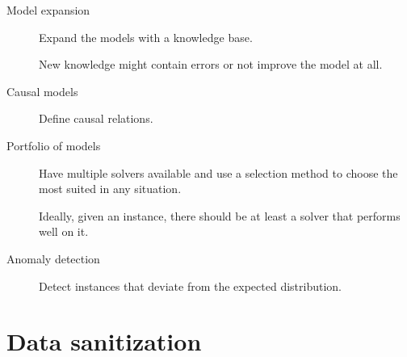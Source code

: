 \begin{description}
    \item[Model expansion] 
        Expand the models with a knowledge base.

        \begin{remark}
            New knowledge might contain errors or not improve the model at all.
        \end{remark}
    
    \item[Causal models] 
        Define causal relations.
    
    \item[Portfolio of models] 
        Have multiple solvers available and use a selection method to choose the most suited in any situation.

        \begin{remark}
            Ideally, given an instance, there should be at least a solver that performs well on it.
        \end{remark}
    
    \item[Anomaly detection] 
        Detect instances that deviate from the expected distribution.
\end{description}



\section{Data sanitization}


